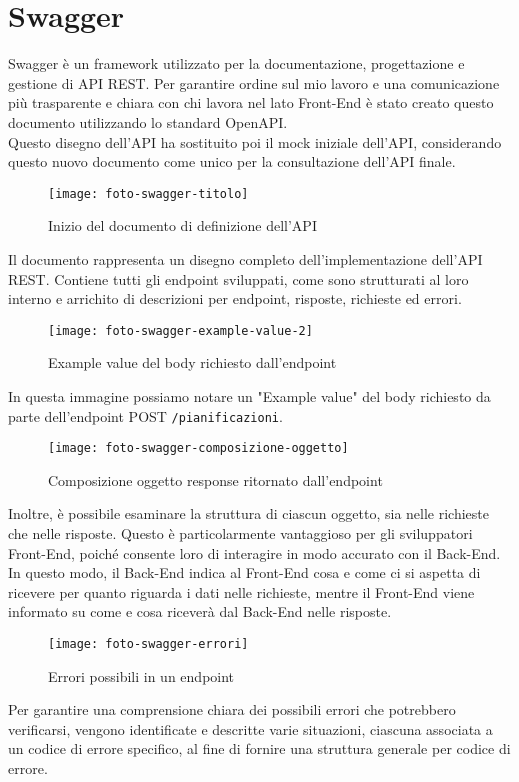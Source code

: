 \hypertarget{swagger}{\section{Swagger}}

Swagger è un framework utilizzato per la documentazione, progettazione e gestione di API REST.
Per garantire ordine sul mio lavoro e una comunicazione più trasparente e chiara con chi lavora nel lato Front-End è stato creato questo documento utilizzando lo standard OpenAPI.\\
Questo disegno dell'API ha sostituito poi il mock iniziale dell'API, considerando questo nuovo documento come unico per la consultazione dell'API finale.
\begin{figure}[H] 
    \centering 
    \texttt{[image: foto-swagger-titolo]} 
    \caption{Inizio del documento di definizione dell'API}
\end{figure}
\noindent Il documento rappresenta un disegno completo dell'implementazione dell'API REST. Contiene tutti gli endpoint sviluppati, come sono strutturati al loro interno e arrichito di descrizioni per endpoint, risposte, richieste ed errori.
\begin{figure}[H] 
    \centering 
    \texttt{[image: foto-swagger-example-value-2]} 
    \caption{Example value del body richiesto dall'endpoint}
\end{figure}
\noindent In questa immagine possiamo notare un "Example value" del body richiesto da parte dell'endpoint POST \texttt{/pianificazioni}.\\
\begin{figure}[H] 
    \centering 
    \texttt{[image: foto-swagger-composizione-oggetto]} 
    \caption{Composizione oggetto response ritornato dall'endpoint}
\end{figure}
\noindent Inoltre, è possibile esaminare la struttura di ciascun oggetto, sia nelle richieste che nelle risposte. Questo è particolarmente vantaggioso per gli sviluppatori Front-End, poiché consente loro di interagire in modo accurato con il Back-End. In questo modo, il Back-End indica al Front-End cosa e come ci si aspetta di ricevere per quanto riguarda i dati nelle richieste, mentre il Front-End viene informato su come e cosa riceverà dal Back-End nelle risposte.
\begin{figure}[H] 
    \centering 
    \texttt{[image: foto-swagger-errori]} 
    \caption{Errori possibili in un endpoint}
\end{figure}
\noindent Per garantire una comprensione chiara dei possibili errori che potrebbero verificarsi, vengono identificate e descritte varie situazioni, ciascuna associata a un codice di errore specifico, al fine di fornire una struttura generale per codice di errore.
